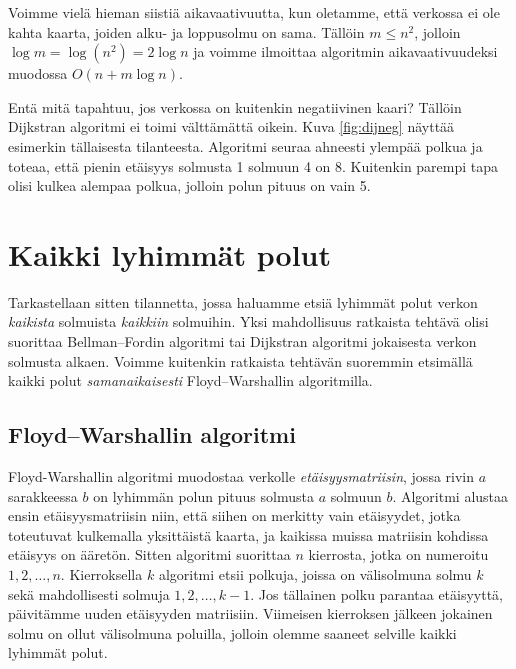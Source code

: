 Voimme vielä hieman siistiä aikavaativuutta, kun oletamme,
että verkossa ei ole kahta kaarta, joiden alku- ja loppusolmu on sama.
Tällöin $m \le n^2$, jolloin $\log m = \log (n^2) = 2 \log n$
ja voimme ilmoittaa algoritmin aikavaativuudeksi muodossa $O(n+m \log n)$.

Entä mitä tapahtuu, jos verkossa on kuitenkin negatiivinen kaari?
Tällöin Dijkstran algoritmi ei toimi välttämättä oikein.
Kuva \ref{fig:dijneg} näyttää esimerkin tällaisesta tilanteesta.
Algoritmi seuraa ahneesti ylempää polkua ja toteaa,
että pienin etäisyys solmusta 1 solmuun 4 on 8.
Kuitenkin parempi tapa olisi kulkea alempaa polkua,
jolloin polun pituus on vain 5.

\section{Kaikki lyhimmät polut}

Tarkastellaan sitten tilannetta, jossa haluamme etsiä
lyhimmät polut verkon \emph{kaikista} solmuista
\emph{kaikkiin} solmuihin.
Yksi mahdollisuus ratkaista tehtävä olisi suorittaa Bellman–Fordin algoritmi
tai Dijkstran algoritmi jokaisesta verkon solmusta alkaen.
Voimme kuitenkin ratkaista tehtävän suoremmin
etsimällä kaikki polut \emph{samanaikaisesti}
Floyd–Warshallin algoritmilla.

\subsection{Floyd–Warshallin algoritmi}

Floyd-Warshallin algoritmi muodostaa verkolle \emph{etäisyysmatriisin},
jossa rivin $a$ sarakkeessa $b$ on lyhimmän polun pituus
solmusta $a$ solmuun $b$.
Algoritmi alustaa ensin etäisyysmatriisin niin,
että siihen on merkitty vain etäisyydet,
jotka toteutuvat kulkemalla yksittäistä kaarta,
ja kaikissa muissa matriisin kohdissa etäisyys on ääretön.
Sitten algoritmi suorittaa $n$ kierrosta,
jotka on numeroitu $1,2,\dots,n$.
Kierroksella $k$ algoritmi etsii polkuja, joissa on välisolmuna
solmu $k$ sekä mahdollisesti solmuja $1,2,\dots,k-1$.
Jos tällainen polku parantaa etäisyyttä,
päivitämme uuden etäisyyden matriisiin.
Viimeisen kierroksen jälkeen jokainen solmu on ollut
välisolmuna poluilla, jolloin olemme saaneet selville
kaikki lyhimmät polut.

